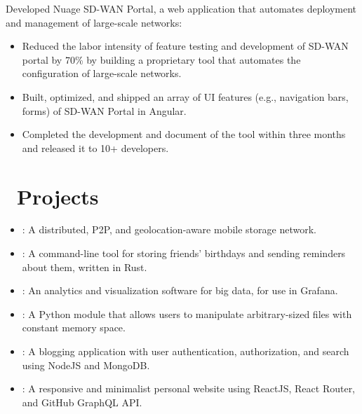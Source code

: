 \documentclass{resume}
\begin{document}
Developed Nuage SD-WAN Portal, a web application that automates deployment and management of large-scale networks:
\begin{itemize}
  \item {Reduced the labor intensity of feature testing and development of SD-WAN portal by 70\%
        by building a proprietary tool that automates the configuration of large-scale networks.}
  \item {Built, optimized, and shipped an array of UI features (e.g., navigation bars, forms) of SD-WAN Portal in Angular.}
  \item {Completed the development and document of the tool within three months and released it to 10+ developers.}
\end{itemize}

\section{\faCodeFork\ Projects}
\begin{itemize}[parsep=0.5ex]
  \item {}: A distributed, P2P, and geolocation-aware mobile storage network.
  \item {}: A command-line tool for storing friends' birthdays and sending reminders about them, written in Rust.
  \item {}: An analytics and visualization software for big data, for use in Grafana.
  \item {}: A Python module that allows users to manipulate arbitrary-sized files with constant memory space.
  \item {}: A blogging application with user authentication, authorization, and search using NodeJS and MongoDB.
  \item {}: A responsive and minimalist personal website using ReactJS, React Router, and GitHub GraphQL API.
\end{itemize}


%
%
\end{document}

